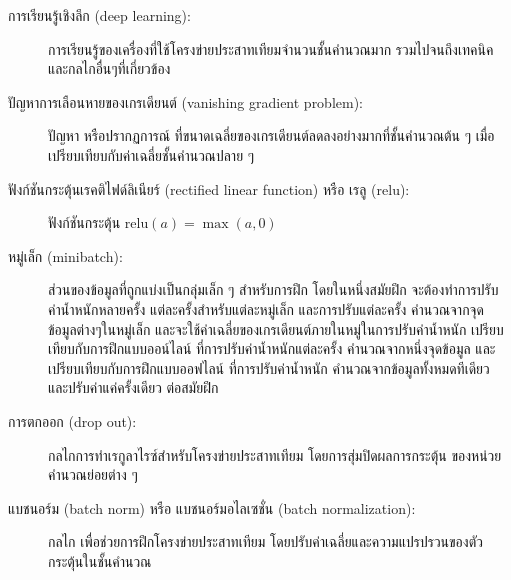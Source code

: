 \begin{description}
	
	\item[การเรียนรู้เชิงลึก  (deep learning):]
การเรียนรู้ของเครื่องที่ใช้โครงข่ายประสาทเทียมจำนวนชั้นคำนวณมาก รวมไปจนถึงเทคนิคและกลไกอื่นๆที่เกี่ยวข้อง

	\item[ปัญหาการเลือนหายของเกรเดียนต์ (vanishing gradient problem):]
ปัญหา หรือปรากฏการณ์ ที่ขนาดเฉลี่ยของเกรเดียนต์ลดลงอย่างมากที่ชั้นคำนวณต้น ๆ เมื่อเปรียบเทียบกับค่าเฉลี่ยชั้นคำนวณปลาย ๆ

	\item[ฟังก์ชันกระตุ้นเรคติไฟด์ลิเนียร์ (rectified linear function) หรือ เรลู  (relu):]
ฟังก์ชันกระตุ้น $\mathrm{relu}(a) = \max(a, 0)$

	\item[หมู่เล็ก (minibatch):]
ส่วนของข้อมูลที่ถูกแบ่งเป็นกลุ่มเล็ก ๆ สำหรับการฝึก โดยในหนึ่งสมัยฝึก จะต้องทำการปรับค่าน้ำหนักหลายครั้ง แต่ละครั้งสำหรับแต่ละหมู่เล็ก 
และการปรับแต่ละครั้ง คำนวณจากจุดข้อมูลต่างๆในหมู่เล็ก
และจะใช้ค่าเฉลี่ยของเกรเดียนต์ภายในหมู่ในการปรับค่าน้ำหนัก
เปรียบเทียบกับการฝึกแบบออน์ไลน์ ที่การปรับค่าน้ำหนักแต่ละครั้ง คำนวณจากหนึ่งจุดข้อมูล
และเปรียบเทียบกับการฝึกแบบออฟไลน์ ที่การปรับค่าน้ำหนัก
คำนวณจากข้อมูลทั้งหมดทีเดียว และปรับค่าแค่ครั้งเดียว ต่อสมัยฝึก

	\item[การตกออก (drop out):]
กลไกการทำเรกูลาไรซ์สำหรับโครงข่ายประสาทเทียม โดยการสุ่มปิดผลการกระตุ้น ของหน่วยคำนวณย่อยต่าง ๆ

	\item[แบชนอร์ม (batch norm) หรือ แบชนอร์มอไลเซชั่น  (batch normalization):]
กลไก เพื่อช่วยการฝึกโครงข่ายประสาทเทียม โดยปรับค่าเฉลี่ยและความแปรปรวนของตัวกระตุ้นในชั้นคำนวณ

	
\end{description}








